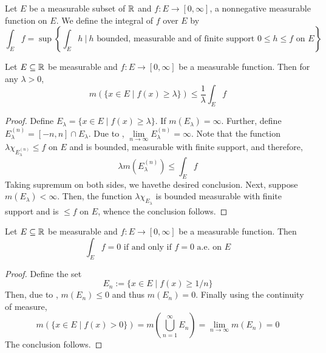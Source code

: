 \begin{definition}
    Let $E$ be a measurable subset of $\mathbb{R}$ and $f:E\to[0,\infty]$, a nonnegative measurable function on $E$. We define the integral of $f$ over $E$ by 
    \begin{equation*}
        \int_E f = \sup\left\{\int_E h~\bigg\vert~h\text{ bounded, measurable and of finite support }0\le h\le f\text{ on }E\right\}
    \end{equation*}
\end{definition}

\begin{theorem}
    Let $E\subseteq\mathbb{R}$ be measurable and $f: E\to[0,\infty]$ be a measurable function. Then for any $\lambda > 0$, 
    \begin{equation*}
        m\left(\{x\in E\mid f(x)\ge\lambda\}\right)\le\frac{1}{\lambda}\int_E f
    \end{equation*}
\end{theorem}
\begin{proof}
    Define $E_\lambda = \{x\in E\mid f(x)\ge\lambda\}$. If $m(E_\lambda) = \infty$. Further, define $E_\lambda^{(n)} = [-n,n]\cap E_\lambda$. Due to , $\lim\limits_{n\to\infty} E_\lambda^{(n)} = \infty$. Note that the function $\lambda\chi_{E_\lambda^{(n)}}\le f$ on $E$ and is bounded, measurable with finite support, and therefore, 
    \begin{equation*}
        \lambda m(E_\lambda^{(n)})\le\int_E f
    \end{equation*}
    Taking supremum on both sides, we havethe desired conclusion. Next, suppose $m(E_\lambda) < \infty$. Then, the function $\lambda\chi_{E_\lambda}$ is bounded measurable with finite support and is $\le f$ on $E$, whence the conclusion follows.
\end{proof}

\begin{proposition}
    Let $E\subseteq\mathbb{R}$ be measurable and $f: E\to[0,\infty]$ be a measurable function. Then 
    \begin{equation*}
        \int_E f = 0\text{ if and only if } f = 0\text{ a.e. on }E
    \end{equation*}
\end{proposition}
\begin{proof}
    Define the set 
    \begin{equation*}
        E_n := \{x\in E\mid f(x)\ge 1/n\}
    \end{equation*}
    Then, due to , $m(E_n)\le 0$ and thus $m(E_n) = 0$. Finally using the continuity of measure, 
    \begin{equation*}
        m(\{x\in E\mid f(x) > 0\}) = m\left(\bigcup_{n = 1}^\infty E_n\right) = \lim_{n\to\infty} m(E_n) = 0
    \end{equation*}
    The conclusion follows.
\end{proof}

